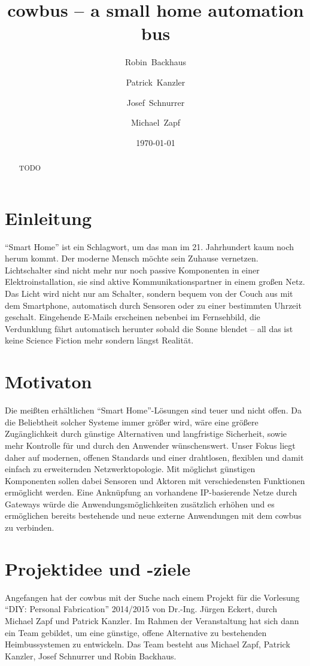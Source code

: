 \documentclass{IEEEtran}
\begin{document}
\title{cowbus -- a small home automation bus}
\author{Robin~Backhaus \and Patrick~Kanzler \and Josef~Schnurrer \and Michael~Zapf}
\date{\today}



\maketitle

\begin{abstract}
    TODO
\end{abstract}


\section{Einleitung}
    \enquote{Smart Home} ist ein Schlagwort, um das man im 21. Jahrhundert
    kaum noch herum kommt. Der moderne Mensch möchte sein Zuhause vernetzen.
    Lichtschalter sind nicht mehr nur noch passive Komponenten in einer
    Elektroinstallation, sie sind aktive Kommunikationspartner in einem großen Netz.
    Das Licht wird nicht nur am Schalter, sondern bequem von der Couch aus mit dem
    Smartphone, automatisch durch Sensoren oder zu einer bestimmten Uhrzeit geschalt. 
    Eingehende E-Mails erscheinen nebenbei im Fernsehbild, die Verdunklung fährt 
    automatisch herunter sobald die Sonne blendet --
    all das ist keine Science Fiction mehr sondern längst Realität.

\section{Motivaton}
    Die meißten erhältlichen \enquote{Smart Home}-Lösungen sind teuer und nicht offen.
    Da die Beliebtheit solcher Systeme immer größer wird, wäre eine größere 
    Zugänglichkeit durch günstige Alternativen und langfristige Sicherheit, 
    sowie mehr Kontrolle für und durch den Anwender wünschenswert.
    Unser Fokus liegt daher auf modernen, offenen Standards und einer drahtlosen, 
    flexiblen und damit einfach zu erweiternden Netzwerktopologie.
    Mit möglichst günstigen Komponenten sollen dabei Sensoren und Aktoren 
    mit verschiedensten Funktionen ermöglicht werden.
    Eine Anknüpfung an vorhandene IP-basierende Netze durch Gateways würde die 
    Anwendungsmöglichkeiten zusätzlich erhöhen 
    und es ermöglichen bereits bestehende und neue externe Anwendungen mit dem 
    cowbus zu verbinden.

\section{Projektidee und -ziele}
    Angefangen hat der cowbus mit der Suche nach einem Projekt für die Vorlesung 
    \enquote{DIY: Personal Fabrication} 2014/2015 von Dr.-Ing. Jürgen Eckert, durch 
    Michael Zapf und Patrick Kanzler. Im Rahmen der Veranstaltung hat sich dann ein 
    Team gebildet, um eine günstige, offene Alternative zu bestehenden Heimbussystemen 
    zu entwickeln. Das Team besteht aus Michael Zapf, Patrick Kanzler, Josef Schnurrer 
    und Robin Backhaus. 
\end{document}
